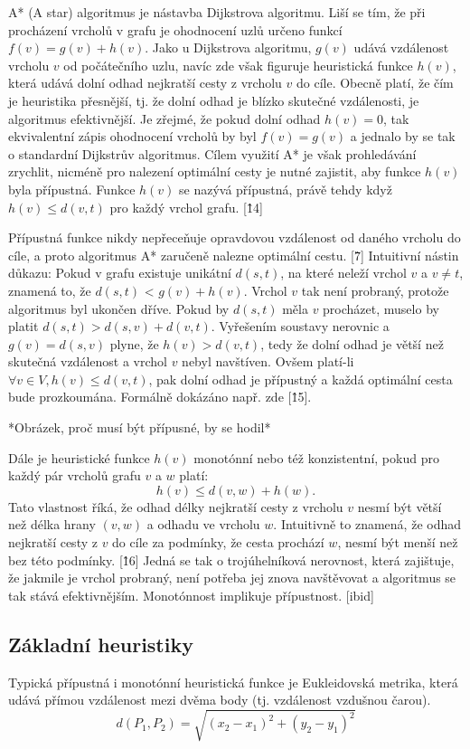 A* (A star) algoritmus je nástavba Dijkstrova algoritmu. Liší se tím, že při procházení vrcholů v grafu je ohodnocení uzlů určeno funkcí $f(v) = g(v) + h(v)$. Jako u Dijkstrova algoritmu, $g(v)$ udává vzdálenost vrcholu $v$ od počátečního uzlu, navíc zde však figuruje heuristická funkce $h(v)$, která udává dolní odhad nejkratší cesty z vrcholu $v$ do cíle. Obecně platí, že čím je heuristika přesnější, tj. že dolní odhad je blízko skutečné vzdálenosti, je algoritmus efektivnější. Je zřejmé, že pokud dolní odhad $h(v) = 0$, tak ekvivalentní zápis ohodnocení vrcholů by byl $f(v) = g(v)$ a jednalo by se tak o standardní Dijkstrův algoritmus. Cílem využití A* je však prohledávání zrychlit, nicméně pro nalezení optimální cesty je nutné zajistit, aby funkce $h(v)$ byla přípustná. Funkce $h(v)$ se nazývá přípustná, právě tehdy když $h(v) \leq d(v, t)$ pro každý vrchol grafu. [\^14]

Přípustná funkce nikdy nepřeceňuje opravdovou vzdálenost od daného vrcholu do cíle, a proto algoritmus A* zaručeně nalezne optimální cestu. [\^7] Intuitivní nástin důkazu: Pokud v grafu existuje unikátní $d(s,t)$, na které neleží vrchol $v$ a $v \neq t$, znamená to, že $d(s,t)$ < $g(v) + h(v)$. Vrchol $v$ tak není probraný, protože algoritmus byl ukončen dříve. Pokud by $d(s,t)$ měla $v$ procházet, muselo by platit $d(s,t) > d(s, v) +d (v,t)$. Vyřešením soustavy nerovnic a $g(v) = d(s,v)$ plyne, že  $h(v) > d(v,t)$, tedy že dolní odhad je větší než skutečná vzdálenost a vrchol $v$ nebyl navštíven. Ovšem platí-li $\forall v \in V, h(v) \leq d(v,t)$, pak dolní odhad je přípustný a každá optimální cesta bude prozkoumána. Formálně dokázáno např. zde [\^15].

*Obrázek, proč musí být přípusné, by se hodil*

Dále je heuristické funkce $h(v)$ monotónní nebo též konzistentní, pokud pro každý pár vrcholů grafu $v$ a $w$ platí:
$$
h(v) \leq d(v,w) + h(w).
$$
Tato vlastnost říká, že odhad délky nejkratší cesty z vrcholu $v$ nesmí být větší než délka hrany $(v,w)$ a odhadu ve vrcholu $w$. Intuitivně to znamená, že odhad nejkratší cesty z $v$ do cíle za podmínky, že cesta prochází $w$, nesmí být menší než bez této podmínky. [\^16] Jedná se tak o trojúhelníková nerovnost, která zajištuje, že jakmile je vrchol probraný, není potřeba jej znova navštěvovat a algoritmus se tak stává efektivnějším. Monotónnost implikuje přípustnost. [ibid]

\subsection{ Základní heuristiky}
Typická přípustná i monotónní heuristická funkce je Eukleidovská metrika, která udává přímou vzdálenost mezi dvěma body (tj. vzdálenost vzdušnou čarou).
$$d(P_1, P_2) = \sqrt{(x_2 - x_1)^2 + (y_2 - y_1)^2}$$

